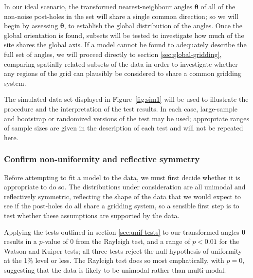\documentclass[../../ArchStats.tex]{subfiles}
\begin{document}
In our ideal scenario, the transformed nearest-neighbour angles $\boldsymbol{\theta}$ of all of the non-noise post-holes  in the set will share a single common direction; so we will begin by assessing $\boldsymbol{\theta}$, to establish the global distribution of the angles. Once the global orientation is found, subsets will be tested to investigate how much of the site shares the global axis. If a model cannot be found to adequately describe the full set of angles, we will proceed directly to section \ref{sec:global-gridding}, comparing spatially-related subsets of the data in order to investigate whether any regions of the grid can plausibly be considered to share a common gridding system.

The simulated data set displayed in Figure~\ref{fig:sim1} will be used to illustrate the procedure and the interpretation of the test results.  In each case, large-sample and bootstrap or randomized versions of the test may be used; appropriate ranges of sample sizes are given in the description of each test and will not be repeated here.



\subsubsection{Confirm non-uniformity and reflective symmetry}

Before attempting to fit a model to the data, we must first decide whether it is appropriate to do so. The distributions under consideration are all unimodal and reflectively symmetric, reflecting the shape of the data that we would expect to see if the post-holes do all share a gridding system, so a sensible first step is to test whether these assumptions are supported by the data. 

Applying the tests outlined in section \ref{sec:unif-tests} to our transformed angles $\boldsymbol{\theta}$ results in a $p$-value of 0 from the Rayleigh test, and a range of $p < 0.01$ for the Watson and Kuiper tests; all three tests reject the null hypothesis of uniformity at the 1\% level or less. The Rayleigh test does so most emphatically, with $p=0$, suggesting that the data is likely to be unimodal rather than multi-modal. 
\end{document}
